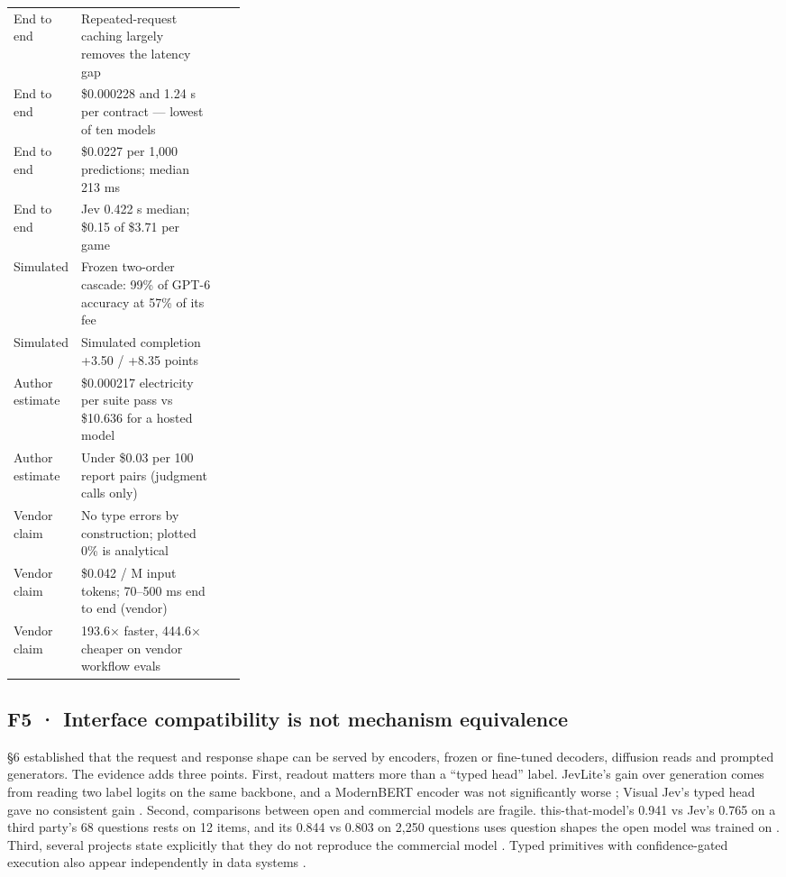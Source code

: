 \begin{table}[tbp]
\begin{tabularx}{\linewidth}{p{0.2\linewidth}Xp{0.1\linewidth}}
End to end & Repeated-request caching largely removes the latency gap & \citep{arxiv2609_22753} \\
End to end & \$0.000228 and 1.24 s per contract — lowest of ten models & \citep{arxiv2609_27678} \\
End to end & \$0.0227 per 1,000 predictions; median 213 ms & \citep{arxiv2609_27535} \\
End to end & Jev 0.422 s median; \$0.15 of \$3.71 per game & \citep{arxiv2609_27331} \\
Simulated & Frozen two-order cascade: 99\% of GPT-6 accuracy at 57\% of its fee & \citep{arxiv2609_26550} \\
Simulated & Simulated completion +3.50 / +8.35 points & \citep{arxiv2609_23136} \\
Author estimate & \$0.000217 electricity per suite pass vs \$10.636 for a hosted model & \citep{arxiv2609_23886} \\
Author estimate & Under \$0.03 per 100 report pairs (judgment calls only) & \citep{arxiv2609_27607} \\
Vendor claim & No type errors by construction; plotted 0\% is analytical & \citep{typesafe2026launch} \\
Vendor claim & \$0.042 / M input tokens; 70–500 ms end to end (vendor) & \citep{typesafe2026launch} \\
Vendor claim & 193.6× faster, 444.6× cheaper on vendor workflow evals & \citep{typesafe2026launch} \\
\bottomrule
\end{tabularx}
\end{table}

\subsection{F5 · Interface compatibility is not mechanism equivalence}

§6 established that the request and response shape can be served by encoders, frozen or fine-tuned decoders, diffusion reads and prompted generators. The evidence adds three points. First, readout matters more than a “typed head” label. JevLite's gain over generation comes from reading two label logits on the same backbone, and a ModernBERT encoder was not significantly worse \citep{arxiv2609_23959}; Visual Jev's typed head gave no consistent gain \citep{arxiv2609_25845}. Second, comparisons between open and commercial models are fragile. this-that-model's 0.941 vs Jev's 0.765 on a third party's 68 questions rests on 12 items, and its 0.844 vs 0.803 on 2,250 questions uses question shapes the open model was trained on \citep{arxiv2609_23886}. Third, several projects state explicitly that they do not reproduce the commercial model \citep{gh_theoleecj_semif,gh_githubnext_localjev,gh_jaredpalmer_kev}. Typed primitives with confidence-gated execution also appear independently in data systems \citep{arxiv2608_20630}.

